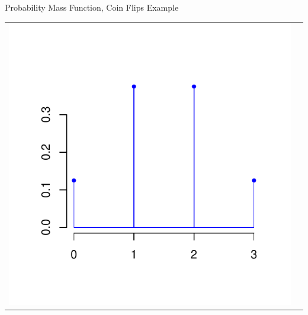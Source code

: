\documentclass[handout]{beamer}
\begin{document}
\begin{frame}{Probability Mass Function, Coin Flips Example}
\begin{center}
\begin{tabular}{p{6cm}p{6cm}}
    \includegraphics[scale=.5]{ch3_pmf.pdf}
    \end{tabular}
    \end{center}
\end{frame}
\end{document}
